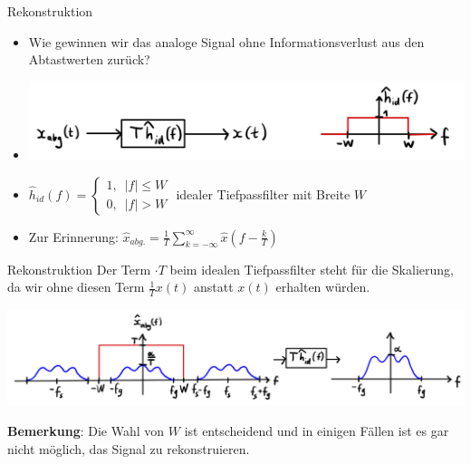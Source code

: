 \documentclass[14pt, aspectratio=169, handout]{beamer}
\begin{document}
\begin{frame}{Rekonstruktion}
    \begin{itemize}
    \item Wie gewinnen wir das analoge Signal ohne Informationsverlust aus den Abtastwerten zurück?
    \item[] \begin{center}
        \includegraphics[width=0.75\linewidth]{figures/filtering3.jpg}
    \end{center}
    \item[] $\hat{h}_{id}(f) = \displaystyle\begin{cases}
        1, \hspace{6pt} |f|\leq W \\
        0, \hspace{6pt} |f|> W
    \end{cases}$ idealer Tiefpassfilter mit Breite $W$
    \item[] Zur Erinnerung: $\hat{x}_{abg.} = \displaystyle\frac{1}{T} \displaystyle\sum_{k = -\infty}^\infty \hat{x}\left( f- \frac{k}{T} \right)$
    \end{itemize}
\end{frame}

\begin{frame}{Rekonstruktion}
    Der Term $\cdot T$ beim idealen Tiefpassfilter steht für die Skalierung, da wir ohne diesen Term $\frac{1}{T}x(t)$ anstatt $x(t)$ erhalten würden.\\
    \begin{center}
        \includegraphics[width=\linewidth]{figures/filtering1.jpg}\\
    \end{center}
    \textbf{Bemerkung}: Die Wahl von $W$ ist entscheidend und in einigen Fällen ist es gar nicht möglich, das Signal zu rekonstruieren.
\end{frame}
\end{document}
